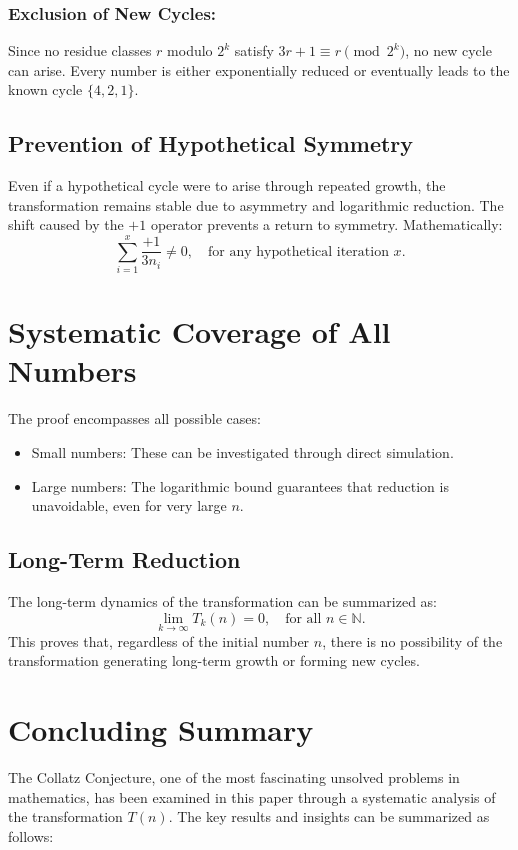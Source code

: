 \documentclass[a4paper,12pt]{article}
\begin{document}
\subsubsection{Exclusion of New Cycles:}
   Since no residue classes \( r \) modulo \( 2^k \) satisfy \( 3r + 1 \equiv r \pmod{2^k} \), no new cycle can arise. Every number is either exponentially reduced or eventually leads to the known cycle \( \{4, 2, 1\} \).

\subsection{Prevention of Hypothetical Symmetry}
Even if a hypothetical cycle were to arise through repeated growth, the transformation remains stable due to asymmetry and logarithmic reduction. The shift caused by the \(+1\) operator prevents a return to symmetry. Mathematically:
\[
\sum_{i=1}^x \frac{+1}{3n_i} \neq 0, \quad \text{for any hypothetical iteration } x.
\]

\section{Systematic Coverage of All Numbers}
The proof encompasses all possible cases:
\begin{itemize}
    \item Small numbers: These can be investigated through direct simulation.
    \item Large numbers: The logarithmic bound guarantees that reduction is unavoidable, even for very large \( n \).
\end{itemize}

\subsection{Long-Term Reduction}
The long-term dynamics of the transformation can be summarized as:
\[
\lim_{k \to \infty} T_k(n) = 0, \quad \text{for all } n \in \mathbb{N}.
\]
This proves that, regardless of the initial number \( n \), there is no possibility of the transformation generating long-term growth or forming new cycles.

\section{Concluding Summary}
The Collatz Conjecture, one of the most fascinating unsolved problems in mathematics, has been examined in this paper through a systematic analysis of the transformation \( T(n) \). The key results and insights can be summarized as follows:
\end{document}

